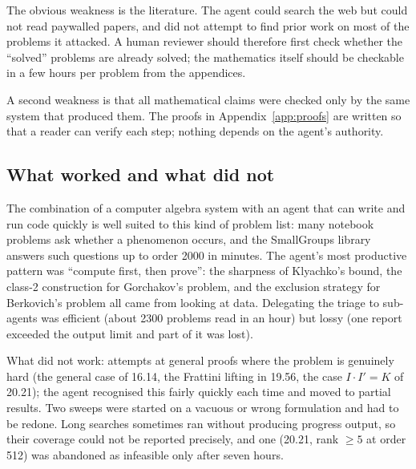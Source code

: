 The obvious weakness is the literature. The agent could search the web but could not read paywalled papers, and
did not attempt to find prior work on most of the problems it attacked. A human reviewer should therefore first
check whether the ``solved'' problems are already solved; the mathematics itself should be checkable in a few
hours per problem from the appendices.

A second weakness is that all mathematical claims were checked only by the same system that produced them. The
proofs in Appendix~\ref{app:proofs} are written so that a reader can verify each step; nothing depends on the
agent's authority.

\subsection{What worked and what did not}
The combination of a computer algebra system with an agent that can write and run code quickly is well suited to
this kind of problem list: many notebook problems ask whether a phenomenon occurs, and the SmallGroups library
answers such questions up to order 2000 in minutes. The agent's most productive pattern was ``compute first, then
prove'': the sharpness of Klyachko's bound, the class-2 construction for Gorchakov's problem, and the exclusion
strategy for Berkovich's problem all came from looking at data. Delegating the triage to sub-agents was
efficient (about 2300 problems read in an hour) but lossy (one report exceeded the output limit and part of it was
lost).

What did not work: attempts at general proofs where the problem is genuinely hard (the general case of 16.14, the Frattini lifting in 19.56, the case $I\cdot I'=K$ of 20.21); the agent recognised this fairly quickly each time and moved to
partial results. Two sweeps were started on a vacuous or wrong formulation and had to be redone. Long searches
sometimes ran without producing progress output, so their coverage could not be reported precisely, and one (20.21, rank $\ge 5$ at order 512) was abandoned as infeasible only after seven hours.

